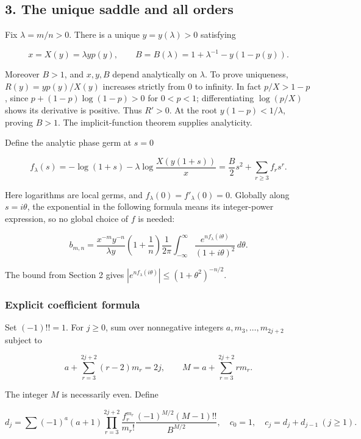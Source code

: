 \documentclass[11pt,letterpaper]{article}
\numberwithin{equation}{subsection}
\theoremstyle{definition}
\theoremstyle{remark}
\theoremstyle{plain}
\begin{document}
\subsection{3. The unique saddle and all orders}\label{a122:the-unique-saddle-and-all-orders}

Fix \(\lambda=m/n>0\). There is a unique \(y=y(\lambda)>0\) satisfying

\[
 x=X(y)=\lambda y p(y),\qquad
 B=B(\lambda)=1+\lambda^{-1}-y(1-p(y)).\tag{3.1}
\]

Moreover \(B>1\), and \(x,y,B\) depend analytically on \(\lambda\). To prove uniqueness, \(R(y)=yp(y)/X(y)\) increases strictly from 0 to infinity. In fact \(p/X>1-p\), since \(p+(1-p)\log(1-p)>0\) for \(0<p<1\); differentiating \(\log(p/X)\) shows its derivative is positive. Thus \(R'>0\). At the root \(y(1-p)<1/\lambda\), proving \(B>1\). The implicit-function theorem supplies analyticity.

Define the analytic phase germ at \(s=0\)

\[
 f_\lambda(s)=-\log(1+s)-\lambda\log\frac{X(y(1+s))}{x}
 =\frac B2s^2+\sum_{r\ge3}f_rs^r.\tag{3.2}
\]

Here logarithms are local germs, and \(f_\lambda(0)=f'_\lambda(0)=0\). Globally along \(s=i\theta\), the exponential in the following formula means its integer-power expression, so no global choice of \(f\) is needed:

\[
 b_{m,n}=\frac{x^{-m}y^{-n}}{\lambda y}\left(1+\frac1n\right)
 \frac1{2\pi}\int_{-\infty}^{\infty}
 \frac{e^{n f_\lambda(i\theta)}}{(1+i\theta)^2}\,d\theta.\tag{3.3}
\]

The bound from Section 2 gives \(|e^{n f_\lambda(i\theta)}|\le(1+\theta^2)^{-n/2}\).

\subsubsection{Explicit coefficient formula}\label{a122:explicit-coefficient-formula}

Set \((-1)!!=1\). For \(j\ge0\), sum over nonnegative integers \(a,m_3,\ldots,m_{2j+2}\) subject to

\[
 a+\sum_{r=3}^{2j+2}(r-2)m_r=2j,
 \qquad M=a+\sum_{r=3}^{2j+2}r m_r.
\]

The integer \(M\) is necessarily even. Define

\[
 d_j=\sum
 (-1)^a(a+1)\prod_{r=3}^{2j+2}\frac{f_r^{m_r}}{m_r!}
 \frac{(-1)^{M/2}(M-1)!!}{B^{M/2}},
 \quad c_0=1,\quad c_j=d_j+d_{j-1}\ (j\ge1).\tag{3.4}
\]
\end{document}
